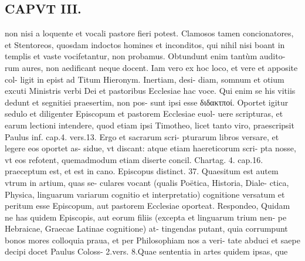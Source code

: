 \documentclass{article}
\begin{document}
\begin{pages}
\section*{CAPVT  III. }
\marginpar{[ p.17 ]}\pstart non nisi a loquente et vocali pastore fieri potest. Clamosos tamen concionatores, et Stentoreos, quosdam indoctos homines et inconditos, qui nihil nisi boant in templis et vaste vocifetantur, non probamus. Obtundunt enim tantùm audito- rum aures, non aedificant neque docent.  \pend\pstart Iam vero ex hoc loco, et vere et apposite col- ligit in epist ad Titum Hieronym. Inertiam, desi- diam, somnum et otium excuti Ministris verbi Dei et pastoribus Ecclesiae hac voce. Qui enim se his vitiis dedunt et segnitiei praesertim, non pos- sunt ipsi esse διδακτποί. Oportet igitur sedulo et diligenter Episcopum et pastorem Ecclesiae euol- uere scripturas, et earum lectioni intendere, quod etiam ipsi Timotheo, licet tanto viro, praescripsit Paulus inf. cap.4. vers.13. Ergo et sacrarum scri- pturarum libros versare, et legere eos oportet as- sidue, vt discant: atque etiam haereticorum scri- pta nosse, vt eos refotent, quemadmodum etiam diserte concil. Chartag. 4. cap.16. praeceptum est, et est in cano. Episcopus distinct. 37.  \pend\pstart Quaesitum est autem vtrum in artium, quas se- culares vocant (qualis Poëtica, Historia, Diale- ctica, Physica, linguarum variarum cognitio et interpretatio) cognitione versatum et peritum esse Episcopum, aut pastorem Ecclesiae oporteat. Respondeo, Quidam ne has quidem Episcopis, aut eorum filiis (excepta et linguarum trium nen- pe Hebraicae, Graecae Latinae cognitione) at- tingendas putant, quia corrumpunt bonos mores colloquia praua, et per Philosophiam nos a veri- tate abduci et saepe decipi docet Paulus Coloss- 2.vers. 8.Quae sententia in artes quidem ipsas, que  \pend

\end{pages}
\end{document}
